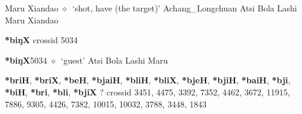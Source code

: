 \begin{list}{}{\leftmargin=1.5em \itemindent=-1.5em}
         Maru 
\hspace{1ex}
         Xiandao 
\hspace{1ex}
         $\diamond$~`shot, have (the target)'
         Achang\_Longchuan 
\hspace{1ex}
         Atsi 
\hspace{1ex}
         Bola 
\hspace{1ex}
         Lashi 
\hspace{1ex}
         Maru 
\hspace{1ex}
         Xiandao 
  \end{list}
\item
\textbf{*biŋX}
  {\tiny crossid 5034}
  \begin{list}{}{\leftmargin=1.5em \itemindent=-1.5em}
  \item {\footnotesize \textbf{*biŋX}}{\tiny 5034}
         $\diamond$~`guest'
         Atsi 
\hspace{1ex}
         Bola 
\hspace{1ex}
         Lashi 
\hspace{1ex}
         Maru 
  \end{list}
\item
\textbf{*briH}, \textbf{*briX}, \textbf{*beH}, \textbf{*bjaiH}, \textbf{*bliH}, \textbf{*bliX}, \textbf{*bjeH}, \textbf{*bjiH}, \textbf{*baiH}, \textbf{*bji}, \textbf{*biH}, \textbf{*bri}, \textbf{*bli}, \textbf{*bjiX}
?
  {\tiny crossid 3451, 4475, 3392, 7352, 4462, 3672, 11915, 7886, 9305, 4426, 7382, 10015, 10032, 3788, 3448, 1843}
